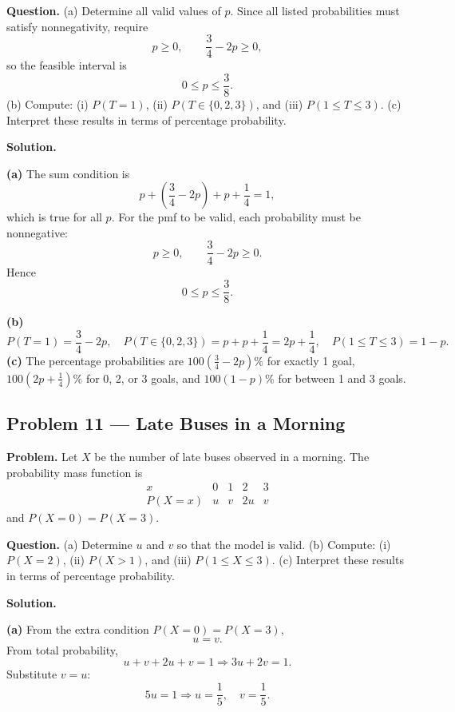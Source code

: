 \begin{ExamProblems}
		\textbf{Question.}
		(a) Determine all valid values of $p$. Since all listed probabilities must satisfy nonnegativity, require
		\[
		p\ge 0,\qquad \frac{3}{4}-2p\ge 0,
		\]
		so the feasible interval is
		\[
		0\le p\le \frac{3}{8}.
		\]
		(b) Compute: (i) $P(T=1)$, (ii) $P(T\in\{0,2,3\})$, and (iii) $P(1\le T\le 3)$.
		(c) Interpret these results in terms of percentage probability.
		
		\textbf{Solution.}

		\textbf{(a)} The sum condition is
		\[
		p+\left(\frac{3}{4}-2p\right)+p+\frac{1}{4}=1,
		\]
		which is true for all $p$.
		For the pmf to be valid, each probability must be nonnegative:
		\[
		p\ge 0,\qquad \frac{3}{4}-2p\ge 0.
		\]
		Hence
		\[
		0\le p\le \frac{3}{8}.
		\]

		\textbf{(b)}
		\[
		P(T=1)=\frac{3}{4}-2p,\quad
		P(T\in\{0,2,3\})=p+p+\frac{1}{4}=2p+\frac{1}{4},\quad
		P(1\le T\le 3)=1-p.
		\]
		\textbf{(c)} The percentage probabilities are $100\left(\frac{3}{4}-2p\right)\%$ for exactly 1 goal, $100\left(2p+\frac{1}{4}\right)\%$ for 0, 2, or 3 goals, and $100(1-p)\%$ for between 1 and 3 goals.
		
		
		\item
		\subsection*{Problem 11 — Late Buses in a Morning}
		
		\textbf{Problem.}
		Let $X$ be the number of late buses observed in a morning. The probability mass function is
		\[
		\begin{array}{c|cccc}
			x & 0 & 1 & 2 & 3\\
			\hline
			P(X=x) & u & v & 2u & v
		\end{array}
		\]
		and $P(X=0)=P(X=3)$.
		
		\textbf{Question.}
		(a) Determine $u$ and $v$ so that the model is valid.
		(b) Compute: (i) $P(X=2)$, (ii) $P(X>1)$, and (iii) $P(1\le X\le 3)$.
		(c) Interpret these results in terms of percentage probability.
		
		\textbf{Solution.}

		\textbf{(a)} From the extra condition $P(X=0)=P(X=3)$,
		\[
		u=v.
		\]
		From total probability,
		\[
		u+v+2u+v=1\Rightarrow 3u+2v=1.
		\]
		Substitute $v=u$:
		\[
		5u=1\Rightarrow u=\frac{1}{5},\quad v=\frac{1}{5}.
		\]


\end{ExamProblems}
